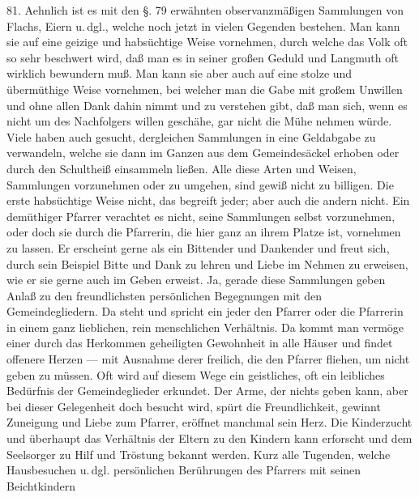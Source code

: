 81. Aehnlich ist es mit den §. 79 erwähnten observanzmäßigen Sammlungen von Flachs, Eiern u.\,dgl., welche noch jetzt in vielen Gegenden bestehen. Man kann sie auf eine geizige und habsüchtige Weise vornehmen, durch welche das Volk oft so sehr beschwert wird, daß man es in seiner großen Geduld und Langmuth oft wirklich bewundern muß. Man kann sie aber auch auf eine stolze und übermüthige Weise vornehmen, bei welcher man die Gabe mit großem Unwillen und ohne allen Dank dahin nimmt und zu verstehen gibt, daß man sich, wenn es nicht um des Nachfolgers willen geschähe, gar nicht die Mühe nehmen würde. Viele haben auch gesucht, dergleichen Sammlungen
in eine Geldabgabe zu verwandeln, welche sie dann im Ganzen aus dem Gemeindesäckel erhoben oder durch den Schultheiß einsammeln ließen. Alle diese Arten und Weisen, Sammlungen vorzunehmen oder zu umgehen, sind gewiß nicht zu billigen. Die erste habsüchtige Weise nicht, das begreift jeder; aber auch die andern nicht. Ein demüthiger Pfarrer verachtet es nicht, seine Sammlungen selbst vorzunehmen, oder doch sie durch die Pfarrerin, die hier ganz an ihrem Platze ist, vornehmen zu lassen. Er erscheint gerne als ein Bittender und Dankender und freut sich, durch sein Beispiel Bitte und Dank zu lehren und Liebe im Nehmen zu erweisen, wie er sie gerne auch im Geben erweist. Ja, gerade diese Sammlungen geben Anlaß zu den freundlichsten persönlichen Begegnungen mit den Gemeindegliedern. Da steht und spricht ein jeder den Pfarrer oder die Pfarrerin in einem ganz lieblichen, rein menschlichen Verhältnis. Da kommt man vermöge einer durch das Herkommen geheiligten Gewohnheit in alle Häuser und findet offenere Herzen — mit Ausnahme derer freilich, die den Pfarrer fliehen, um nicht geben zu müssen. Oft wird auf diesem Wege ein geistliches, oft ein leibliches Bedürfnis der Gemeindeglieder erkundet. Der Arme, der nichts geben kann, aber bei dieser Gelegenheit doch besucht wird, spürt die Freundlichkeit, gewinnt Zuneigung und Liebe zum Pfarrer, eröffnet manchmal sein Herz. Die Kinderzucht und überhaupt das Verhältnis der Eltern zu den Kindern kann erforscht und dem Seelsorger zu Hilf und Tröstung bekannt werden. Kurz alle Tugenden, welche Hausbesuchen u.\,dgl. persönlichen Berührungen des Pfarrers mit seinen Beichtkindern
